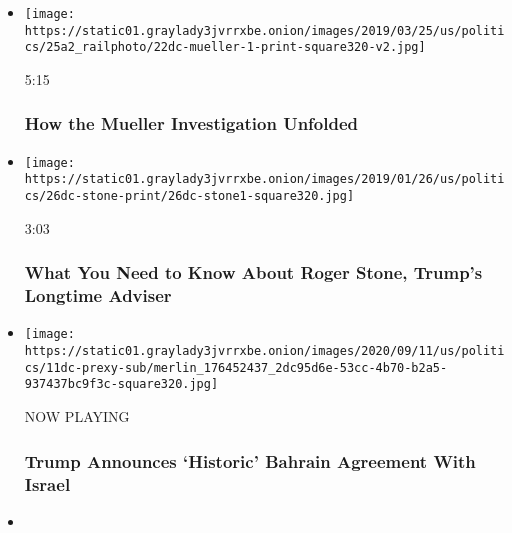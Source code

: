 \begin{itemize}
\item
  \href{https://www.nytimes3xbfgragh.onion/video/us/politics/100000006381390/robert-mueller-report-background.html?action=click\&module=video-series-bar\&region=header\&pgtype=Article\&playlistId=video/us-politics}{}

  \texttt{[image: https://static01.graylady3jvrrxbe.onion/images/2019/03/25/us/politics/25a2\_railphoto/22dc-mueller-1-print-square320-v2.jpg]}

  5:15

  \hypertarget{how-the-mueller-investigation-unfolded}{%
  \subsubsection{How the Mueller Investigation
  Unfolded}\label{how-the-mueller-investigation-unfolded}}
\item
  \href{https://www.nytimes3xbfgragh.onion/video/us/politics/100000006236443/who-is-roger-stone.html?action=click\&module=video-series-bar\&region=header\&pgtype=Article\&playlistId=video/us-politics}{}

  \texttt{[image: https://static01.graylady3jvrrxbe.onion/images/2019/01/26/us/politics/26dc-stone-print/26dc-stone1-square320.jpg]}

  3:03

  \hypertarget{what-you-need-to-know-about-roger-stone-trumps-longtime-adviser}{%
  \subsubsection{What You Need to Know About Roger Stone, Trump's
  Longtime
  Adviser}\label{what-you-need-to-know-about-roger-stone-trumps-longtime-adviser}}
\item
  \texttt{[image: https://static01.graylady3jvrrxbe.onion/images/2020/09/11/us/politics/11dc-prexy-sub/merlin\_176452437\_2dc95d6e-53cc-4b70-b2a5-937437bc9f3c-square320.jpg]}

  NOW PLAYING

  \hypertarget{trump-announces-historic-bahrain-agreement-with-israel-2}{%
  \subsubsection{Trump Announces `Historic' Bahrain Agreement With
  Israel}\label{trump-announces-historic-bahrain-agreement-with-israel-2}}
\item
  \href{https://www.nytimes3xbfgragh.onion/video/us/politics/100000007334631/trump-woodward-coronavirus-interview.html?action=click\&module=video-series-bar\&region=header\&pgtype=Article\&playlistId=video/us-politics}{}


\end{itemize}
